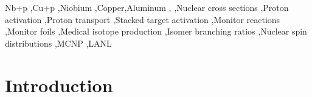 \documentclass[3p]{elsarticle}
\newcommand{\comment}[1]{\todo[color=blue!20!white,inline]{ASV: #1}}
\begin{document}
\begin{frontmatter}





\begin{keyword}
Nb+p \sep Cu+p \sep Niobium \sep Copper\sep Aluminum \sep {}  \sep Nuclear cross sections \sep Proton activation \sep Proton transport \sep Stacked target activation \sep Monitor reactions \sep Monitor foils \sep Medical isotope production \sep Isomer branching ratios \sep Nuclear spin distributions  \sep MCNP \sep  LANL
% 
% 
\end{keyword}

\end{frontmatter}








\listoftodos


\linenumbers



\section{Introduction} \label{sec:intro}

% 
% 
% 

\end{document}
